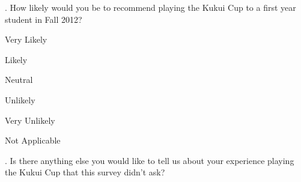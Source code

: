 \vspace{5 mm}
. How likely would you be to recommend playing the Kukui Cup to a first year student in Fall 2012?

\begin{radiobutton}
	\item Very Likely
	\item Likely
	\item Neutral
	\item Unlikely
	\item Very Unlikely
	\item Not Applicable
\end{radiobutton}

\vspace{5 mm}
. Is there anything else you would like to tell us about your experience playing the Kukui Cup that this survey didn't ask?
